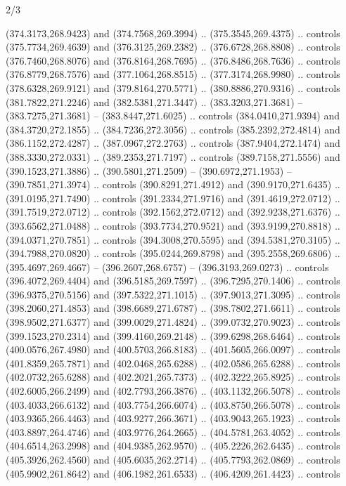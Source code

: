 \begin{flagdescription}{2/3}
\begin{scope}[xshift=0.5\flaglength,yshift=0.5\flagwidth,scale=\flagwidth/495.65]
\begin{scope}[y=0.8pt, x=0.8pt, yscale=-1,shift={(-463.76,-309.78)}]
  (374.3173,268.9423) and (374.7568,269.3994) .. (375.3545,269.4375) .. controls
  (375.7734,269.4639) and (376.3125,269.2382) .. (376.6728,268.8808) .. controls
  (376.7460,268.8076) and (376.8164,268.7695) .. (376.8486,268.7636) .. controls
  (376.8779,268.7576) and (377.1064,268.8515) .. (377.3174,268.9980) .. controls
  (378.6328,269.9121) and (379.8164,270.5771) .. (380.8886,270.9316) .. controls
  (381.7822,271.2246) and (382.5381,271.3447) .. (383.3203,271.3681) --
  (383.7275,271.3681) -- (383.8447,271.6025) .. controls (384.0410,271.9394) and
  (384.3720,272.1855) .. (384.7236,272.3056) .. controls (385.2392,272.4814) and
  (386.1152,272.4287) .. (387.0967,272.2763) .. controls (387.9404,272.1474) and
  (388.3330,272.0331) .. (389.2353,271.7197) .. controls (389.7158,271.5556) and
  (390.1523,271.3886) .. (390.5801,271.2509) -- (390.6972,271.1953) --
  (390.7851,271.3974) .. controls (390.8291,271.4912) and (390.9170,271.6435) ..
  (391.0195,271.7490) .. controls (391.2334,271.9716) and (391.4619,272.0712) ..
  (391.7519,272.0712) .. controls (392.1562,272.0712) and (392.9238,271.6376) ..
  (393.6562,271.0488) .. controls (393.7734,270.9521) and (393.9199,270.8818) ..
  (394.0371,270.7851) .. controls (394.3008,270.5595) and (394.5381,270.3105) ..
  (394.7988,270.0820) .. controls (395.0244,269.8798) and (395.2558,269.6806) ..
  (395.4697,269.4667) -- (396.2607,268.6757) -- (396.3193,269.0273) .. controls
  (396.4072,269.4404) and (396.5185,269.7597) .. (396.7295,270.1406) .. controls
  (396.9375,270.5156) and (397.5322,271.1015) .. (397.9013,271.3095) .. controls
  (398.2060,271.4853) and (398.6689,271.6787) .. (398.7802,271.6611) .. controls
  (398.9502,271.6377) and (399.0029,271.4824) .. (399.0732,270.9023) .. controls
  (399.1523,270.2314) and (399.4160,269.2148) .. (399.6298,268.6464) .. controls
  (400.0576,267.4980) and (400.5703,266.8183) .. (401.5605,266.0097) .. controls
  (401.8359,265.7871) and (402.0468,265.6288) .. (402.0586,265.6288) .. controls
  (402.0732,265.6288) and (402.2021,265.7373) .. (402.3222,265.8925) .. controls
  (402.6005,266.2499) and (402.7793,266.3876) .. (403.1132,266.5078) .. controls
  (403.4033,266.6132) and (403.7754,266.6074) .. (403.8750,266.5078) .. controls
  (403.9365,266.4463) and (403.9277,266.3671) .. (403.9043,265.1923) .. controls
  (403.8897,264.4746) and (403.9776,264.2665) .. (404.5781,263.4052) .. controls
  (404.6514,263.2998) and (404.9385,262.9570) .. (405.2226,262.6435) .. controls
  (405.3926,262.4560) and (405.6035,262.2714) .. (405.7793,262.0869) .. controls
  (405.9902,261.8642) and (406.1982,261.6533) .. (406.4209,261.4423) .. controls

\end{scope}
\end{scope}
\end{flagdescription}
